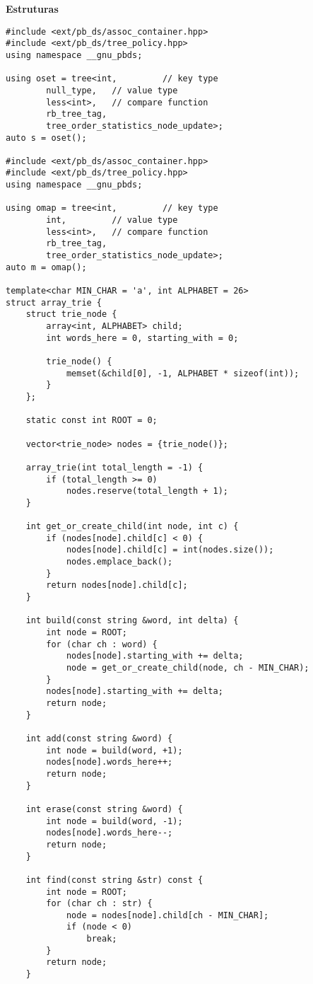 \documentclass{article}
\begin{document}
\large
\huge\textbf{Estruturas}
\large
\begin{lstlisting}
#include <ext/pb_ds/assoc_container.hpp>
#include <ext/pb_ds/tree_policy.hpp>
using namespace __gnu_pbds;

using oset = tree<int,         // key type
		null_type,   // value type
		less<int>,   // compare function
		rb_tree_tag,
		tree_order_statistics_node_update>;
auto s = oset();

#include <ext/pb_ds/assoc_container.hpp>
#include <ext/pb_ds/tree_policy.hpp>
using namespace __gnu_pbds;

using omap = tree<int,         // key type
		int,         // value type
		less<int>,   // compare function
		rb_tree_tag,
		tree_order_statistics_node_update>;
auto m = omap();

template<char MIN_CHAR = 'a', int ALPHABET = 26>
struct array_trie {
    struct trie_node {
        array<int, ALPHABET> child;
        int words_here = 0, starting_with = 0;

        trie_node() {
            memset(&child[0], -1, ALPHABET * sizeof(int));
        }
    };

    static const int ROOT = 0;

    vector<trie_node> nodes = {trie_node()};

    array_trie(int total_length = -1) {
        if (total_length >= 0)
            nodes.reserve(total_length + 1);
    }

    int get_or_create_child(int node, int c) {
        if (nodes[node].child[c] < 0) {
            nodes[node].child[c] = int(nodes.size());
            nodes.emplace_back();
        }
        return nodes[node].child[c];
    }

    int build(const string &word, int delta) {
        int node = ROOT;
        for (char ch : word) {
            nodes[node].starting_with += delta;
            node = get_or_create_child(node, ch - MIN_CHAR);
        }
        nodes[node].starting_with += delta;
        return node;
    }

    int add(const string &word) {
        int node = build(word, +1);
        nodes[node].words_here++;
        return node;
    }

    int erase(const string &word) {
        int node = build(word, -1);
        nodes[node].words_here--;
        return node;
    }

    int find(const string &str) const {
        int node = ROOT;
        for (char ch : str) {
            node = nodes[node].child[ch - MIN_CHAR];
            if (node < 0)
                break;
        }
        return node;
    }


\end{lstlisting}
\end{document}
